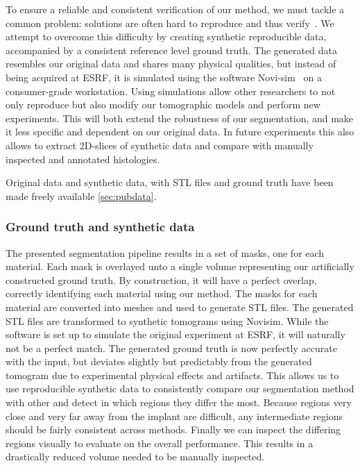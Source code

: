 To ensure a reliable and consistent verification of our method, we must tackle
a common problem: solutions are often hard to reproduce and thus
verify~\cite{replication-crisis}. We attempt to overcome this difficulty by
creating synthetic reproducible data, accompanied by a consistent reference
level ground truth. The generated data resembles our original data and shares
many physical qualities, but instead of being acquired at ESRF, it is simulated
using the software Novi-sim~\cite{novisim} on a consumer-grade workstation.
Using simulations allow other researchers to not only reproduce but also modify
our tomographic models and perform new experiments. This will both extend the
robustness of our segmentation, and make it less specific and dependent on our
original data.  In future experiments this also allows to extract 2D-slices of
synthetic data and compare with manually inspected and annotated histologies.

Original data and synthetic data, with STL files and ground truth have been
made freely available \ref{sec:pubdata}.

\subsubsection{Ground truth and synthetic data}

The presented segmentation pipeline results in a set of masks, one for each
material.  Each mask is overlayed unto a single volume representing our
artificially constructed ground truth. By construction, it will have a perfect
overlap, correctly identifying each material using our method.  The masks for
each material are converted into meshes and used to generate STL files.  The
generated STL files are transformed to synthetic tomograms using Novisim.
While the software is set up to simulate the original experiment at ESRF, it
will naturally not be a perfect match. The generated ground truth is now
perfectly accurate with the input, but deviates slightly but predictably from
the generated tomogram due to experimental physical effects and artifacts. This
allows us to use reproducible synthetic data to consistently compare our
segmentation method with other and detect in which regions they differ the
most. Because regions very close and very far away from the implant are
difficult, any intermediate regions should be fairly consistent across methods.
Finally we can inspect the differing regions visually to evaluate on the
overall performance. This results in a drastically reduced volume needed to be
manually inspected.

